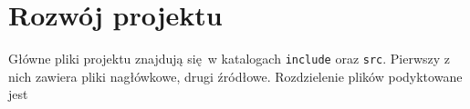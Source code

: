\section{Rozwój projektu}
\label{app:rozwoj_projektu}

Główne pliki projektu znajdują się w katalogach {\tt include} oraz {\tt src}. Pierwszy z nich zawiera pliki nagłówkowe, drugi źródłowe. Rozdzielenie plików podyktowane jest
